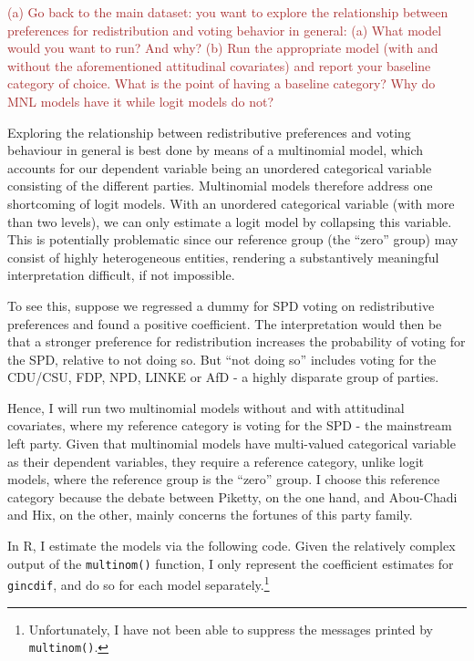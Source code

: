 \documentclass[
]{article}
\begin{document}
\textcolor{brown}{(a) Go back to the main dataset: you want to explore the relationship between preferences for redistribution and voting behavior in general: (a) What model would you want to run? And why? (b) Run the appropriate model (with and without the aforementioned attitudinal covariates) and report your baseline category of choice. What is the point of having a baseline category? Why do MNL models have it while logit models do not?}

Exploring the relationship between redistributive preferences and voting
behaviour in general is best done by means of a multinomial model, which
accounts for our dependent variable being an unordered categorical
variable consisting of the different parties. Multinomial models
therefore address one shortcoming of logit models. With an unordered
categorical variable (with more than two levels), we can only estimate a
logit model by collapsing this variable. This is potentially problematic
since our reference group (the ``zero'' group) may consist of highly
heterogeneous entities, rendering a substantively meaningful
interpretation difficult, if not impossible.

To see this, suppose we regressed a dummy for SPD voting on
redistributive preferences and found a positive coefficient. The
interpretation would then be that a stronger preference for
redistribution increases the probability of voting for the SPD, relative
to not doing so. But ``not doing so'' includes voting for the CDU/CSU,
FDP, NPD, LINKE or AfD - a highly disparate group of parties.

Hence, I will run two multinomial models without and with attitudinal
covariates, where my reference category is voting for the SPD - the
mainstream left party. Given that multinomial models have multi-valued
categorical variable as their dependent variables, they require a
reference category, unlike logit models, where the reference group is
the ``zero'' group. I choose this reference category because the debate
between Piketty, on the one hand, and Abou-Chadi and Hix, on the other,
mainly concerns the fortunes of this party family.

In R, I estimate the models via the following code. Given the relatively
complex output of the \texttt{multinom()} function, I only represent the
coefficient estimates for \texttt{gincdif}, and do so for each model
separately.\footnote{Unfortunately, I have not been able to suppress the
  messages printed by \texttt{multinom()}.}
\end{document}

